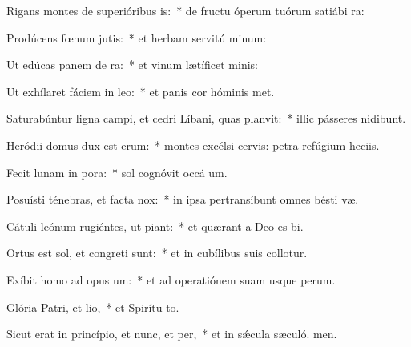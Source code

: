 \item Rigans montes de superióribus is:~* de fructu óperum tuórum satiábi ra:
\item Prodúcens fœnum jutis:~* et herbam servitú minum:
\item Ut edúcas panem de ra:~* et vinum lætíficet  minis:
\item Ut exhílaret fáciem in leo:~* et panis cor hóminis met.
\item Saturabúntur ligna campi, et cedri Líbani, quas planvit:~* illic pásseres nidibunt.
\item Heródii domus dux est erum:~* montes excélsi cervis: petra refúgium heciis.
\item Fecit lunam in pora:~* sol cognóvit occá um.
\item Posuísti ténebras, et facta  nox:~* in ipsa pertransíbunt omnes bésti væ.
\item Cátuli leónum rugiéntes, ut piant:~* et quærant a Deo es bi.
\item Ortus est sol, et congreti sunt:~* et in cubílibus suis collotur.
\item Exíbit homo ad opus um:~* et ad operatiónem suam usque  perum.
\item Glória Patri, et lio,~* et Spirítu to.
\item Sicut erat in princípio, et nunc, et per,~* et in sǽcula sæculó. men.
